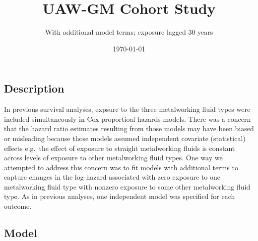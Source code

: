 \documentclass[]{article}
\title{UAW-GM Cohort Study}
\subtitle{With additional model terms; exposure lagged 30 years}
\author{}
\date{\today}
\begin{document}
\maketitle

\renewcommand{\arraystretch}{1.1}
\renewcommand{\headrulewidth}{0pt}
\thispagestyle{empty}

\hypertarget{description}{%
\subsection{Description}\label{description}}

In previous survival analyses, expsure to the three metalworking fluid
types were included simultaneously in Cox proportioal hazards models.
There was a concern that the hazard ratio estimates resulting from those
models may have been biased or misleading because those models assumed
independent covariate (statistical) effects e.g.~the effect of exposure
to straight metalworking fluids is constant across levels of exposure to
other metalworking fluid types. One way we attempted to address this
concern was to fit models with additional terms to capture changes in
the log-hazard associated with zero exposure to one metalworking fluid
type with nonzero exposure to some other metalworking fluid type. As in
previous analyses, one independent model was specified for each outcome.

\hypertarget{model}{%
\subsection{Model}\label{model}}
\end{document}
